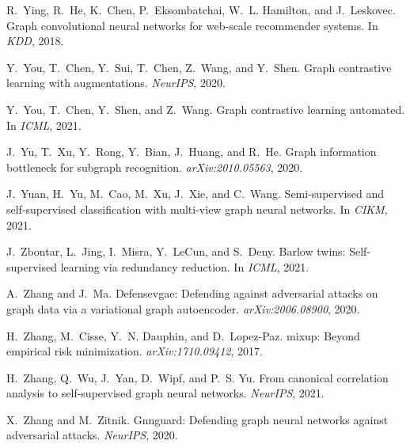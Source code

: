 \documentclass[11pt]{article}
\begin{document}
\begin{thebibliography}{10}
\begin{small}
R.~Ying, R.~He, K.~Chen, P.~Eksombatchai, W.~L. Hamilton, and J.~Leskovec.
\newblock Graph convolutional neural networks for web-scale recommender
  systems.
\newblock In \emph{KDD}, 2018.

Y.~You, T.~Chen, Y.~Sui, T.~Chen, Z.~Wang, and Y.~Shen.
\newblock Graph contrastive learning with augmentations.
\newblock \emph{NeurIPS}, 2020.

Y.~You, T.~Chen, Y.~Shen, and Z.~Wang.
\newblock Graph contrastive learning automated.
\newblock In \emph{ICML}, 2021.

J.~Yu, T.~Xu, Y.~Rong, Y.~Bian, J.~Huang, and R.~He.
\newblock Graph information bottleneck for subgraph recognition.
\newblock \emph{arXiv:2010.05563}, 2020.

J.~Yuan, H.~Yu, M.~Cao, M.~Xu, J.~Xie, and C.~Wang.
\newblock Semi-supervised and self-supervised classification with multi-view
  graph neural networks.
\newblock In \emph{CIKM}, 2021.

J.~Zbontar, L.~Jing, I.~Misra, Y.~LeCun, and S.~Deny.
\newblock Barlow twins: Self-supervised learning via redundancy reduction.
\newblock In \emph{ICML}, 2021.

A.~Zhang and J.~Ma.
\newblock Defensevgae: Defending against adversarial attacks on graph data via
  a variational graph autoencoder.
\newblock \emph{arXiv:2006.08900}, 2020.

H.~Zhang, M.~Cisse, Y.~N. Dauphin, and D.~Lopez-Paz.
\newblock mixup: Beyond empirical risk minimization.
\newblock \emph{arXiv:1710.09412}, 2017.

H.~Zhang, Q.~Wu, J.~Yan, D.~Wipf, and P.~S. Yu.
\newblock From canonical correlation analysis to self-supervised graph neural
  networks.
\newblock \emph{NeurIPS}, 2021.

X.~Zhang and M.~Zitnik.
\newblock Gnnguard: Defending graph neural networks against adversarial
  attacks.
\newblock \emph{NeurIPS}, 2020.


\end{small}
\end{thebibliography}
\end{document}
